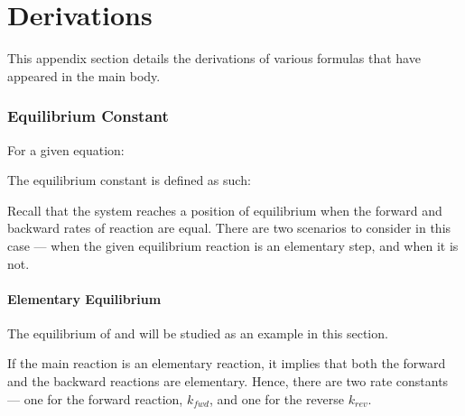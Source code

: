 
\pagebreak
\hypertarget{AppendixDerivations}{}
\part{Derivations}

	This appendix section details the derivations of various formulas that have appeared in the main body.

	\section{Equilibrium Constant}

		For a given equation:


		The equilibrium constant is defined as such:

		\eqndiagram{
			 \[ K_{c} = \frac{[\ch{C}]^{c}[\ch{D}]^{d}}{[\ch{A}]^{a}[\ch{B}]^{b}} \]
		}

		Recall that the system reaches a position of equilibrium when the forward and backward rates of reaction are equal. There are two
		scenarios to consider in this case --- when the given equilibrium reaction is an elementary step, and when it is not.

		\subsection{Elementary Equilibrium}

			The equilibrium of  and  will be studied as an example in this section.


			If the main reaction is an elementary reaction, it implies that both the forward and the backward reactions are elementary. Hence,
			there are two rate constants --- one for the forward reaction, $k_{fwd}$, and one for the reverse $k_{rev}$.

